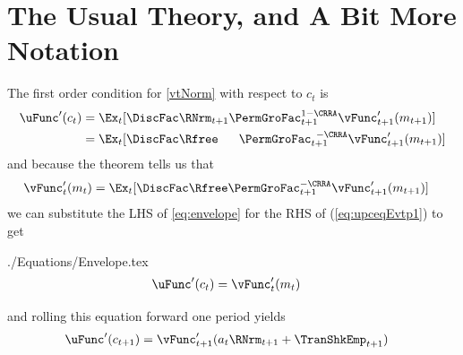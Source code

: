 \documentclass[titlepage, headings=optiontotocandhead]{\econtex}
\begin{document}
\hypertarget{The-Usual-Theory}{}
\section{The Usual Theory, and A Bit More Notation}
\label{sec:usualtheory}


The first order condition for \eqref{vtNorm} with respect to ${c}_{t}$ is
\begin{equation}\begin{gathered}\begin{aligned}
      \uFunc^{\prime}({c}_{t})  & = \Ex_{t}[\DiscFac \RNrm_{t+1}\PermGroFac_{t+1}^{1-\CRRA}\null{\vFunc}^{\prime}_{t+1}({m}_{t+1})]  \label{eq:upceqEvtp1}
      \\                        & =  \Ex_{t}[\DiscFac\Rfree\phantom{._{t+1}}\PermGroFac_{t+1}^{\phantom{1}-\CRRA}\null{\vFunc}^{\prime}_{t+1}({m}_{t+1})] 
    \end{aligned}\end{gathered}\end{equation}
and because the  theorem tells us that
\begin{equation}\begin{gathered}\begin{aligned}
      \null{\vFunc}^{\prime}_{t}({m}_{t})  & =  \Ex_{t} [\DiscFac\Rfree\PermGroFac_{t+1}^{-\CRRA}\null{\vFunc}^{\prime}_{t+1}({m}_{t+1})] \label{eq:envelope}
    \end{aligned}\end{gathered}\end{equation}
we can substitute the LHS of \eqref{eq:envelope} for the RHS of
(\ref{eq:upceqEvtp1}) to get
\begin{verbatimwrite}{./Equations/Envelope.tex}
  \begin{equation}\begin{gathered}\begin{aligned}
        \uFunc^{\prime}({c}_{t})  & = \null{\vFunc}^{\prime}_{t}({m}_{t})\label{eq:Envelope}
      \end{aligned}\end{gathered}\end{equation}
\end{verbatimwrite}
\unskip
and rolling this equation forward one period yields
\begin{equation}\begin{gathered}\begin{aligned}
      \uFunc^{\prime}({c}_{t+1})  & = \null{\vFunc}^{\prime}_{t+1}({a}_{t}\RNrm_{t+1}+\TranShkEmp_{t+1}) \label{eq:upctp1EqVpxtp1}
    \end{aligned}\end{gathered}\end{equation}
\end{document}
